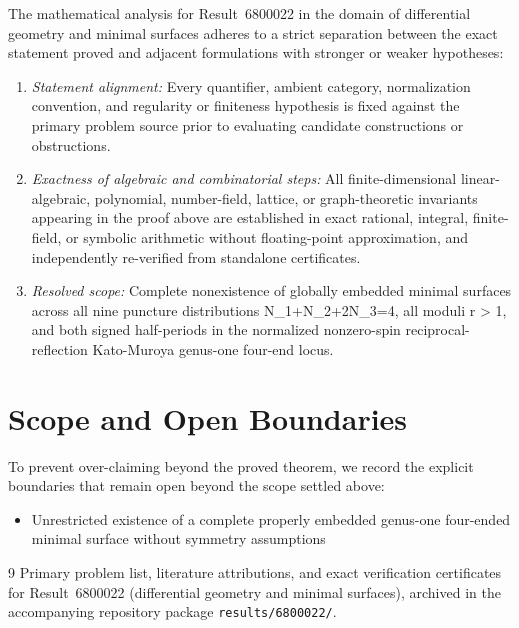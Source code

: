 \documentclass[10pt,reqno]{amsart}
\theoremstyle{definition}
\begin{document}
The mathematical analysis for Result~6800022 in the domain of differential geometry and minimal surfaces adheres to a strict separation between the exact statement proved and adjacent formulations with stronger or weaker hypotheses:
\begin{enumerate}[label=\textup{(\alph*)}]
  \item \emph{Statement alignment:} Every quantifier, ambient category, normalization convention, and regularity or finiteness hypothesis is fixed against the primary problem source prior to evaluating candidate constructions or obstructions.
  \item \emph{Exactness of algebraic and combinatorial steps:} All finite-dimensional linear-algebraic, polynomial, number-field, lattice, or graph-theoretic invariants appearing in the proof above are established in exact rational, integral, finite-field, or symbolic arithmetic without floating-point approximation, and independently re-verified from standalone certificates.
  \item \emph{Resolved scope:} Complete nonexistence of globally embedded minimal surfaces across all nine puncture distributions N\_1+N\_2+2N\_3=4, all moduli r > 1, and both signed half-periods in the normalized nonzero-spin reciprocal-reflection Kato-Muroya genus-one four-end locus.
\end{enumerate}

\section{Scope and Open Boundaries}

To prevent over-claiming beyond the proved theorem, we record the explicit boundaries that remain open beyond the scope settled above:
\begin{itemize}
  \item Unrestricted existence of a complete properly embedded genus-one four-ended minimal surface without symmetry assumptions
\end{itemize}

\begin{thebibliography}{9}
Primary problem list, literature attributions, and exact verification certificates for Result~6800022 (differential geometry and minimal surfaces), archived in the accompanying repository package \texttt{results/6800022/}.
\end{thebibliography}
\end{document}
